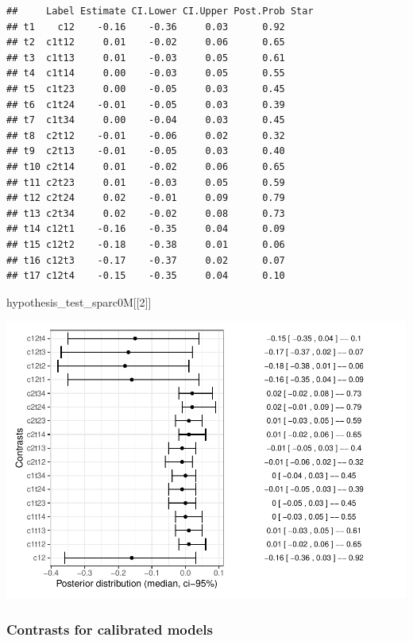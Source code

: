 \documentclass[
]{article}
\newenvironment{Shaded}{\begin{snugshade}}{\end{snugshade}}
\newcommand{\DecValTok}[1]{\textcolor[rgb]{0.00,0.00,0.81}{#1}}
\newcommand{\NormalTok}[1]{#1}
\begin{document}
\begin{verbatim}
##     Label Estimate CI.Lower CI.Upper Post.Prob Star
## t1    c12    -0.16    -0.36     0.03      0.92     
## t2  c1t12     0.01    -0.02     0.06      0.65     
## t3  c1t13     0.01    -0.03     0.05      0.61     
## t4  c1t14     0.00    -0.03     0.05      0.55     
## t5  c1t23     0.00    -0.05     0.03      0.45     
## t6  c1t24    -0.01    -0.05     0.03      0.39     
## t7  c1t34     0.00    -0.04     0.03      0.45     
## t8  c2t12    -0.01    -0.06     0.02      0.32     
## t9  c2t13    -0.01    -0.05     0.03      0.40     
## t10 c2t14     0.01    -0.02     0.06      0.65     
## t11 c2t23     0.01    -0.03     0.05      0.59     
## t12 c2t24     0.02    -0.01     0.09      0.79     
## t13 c2t34     0.02    -0.02     0.08      0.73     
## t14 c12t1    -0.16    -0.35     0.04      0.09     
## t15 c12t2    -0.18    -0.38     0.01      0.06     
## t16 c12t3    -0.17    -0.37     0.02      0.07     
## t17 c12t4    -0.15    -0.35     0.04      0.10
\end{verbatim}

\begin{Shaded}
\begin{Highlighting}[]
\NormalTok{hypothesis\_test\_sparc0M[[}\DecValTok{2}\NormalTok{]]}
\end{Highlighting}
\end{Shaded}

\includegraphics{08_Publish_GUSO_ASIL_files/figure-latex/Contrasts0M-2.pdf}

\hypertarget{contrasts-for-calibrated-models}{%
\subsubsection{Contrasts for calibrated
models}\label{contrasts-for-calibrated-models}}
\end{document}
